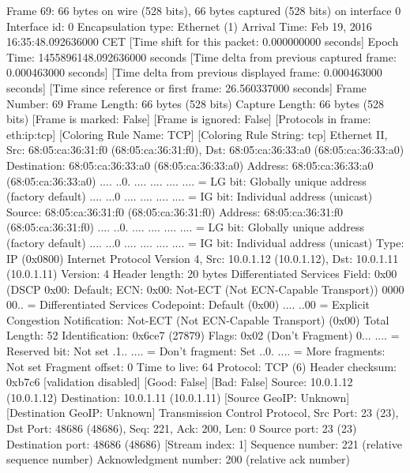Frame 69: 66 bytes on wire (528 bits), 66 bytes captured (528 bits) on interface 0
    Interface id: 0
    Encapsulation type: Ethernet (1)
    Arrival Time: Feb 19, 2016 16:35:48.092636000 CET
    [Time shift for this packet: 0.000000000 seconds]
    Epoch Time: 1455896148.092636000 seconds
    [Time delta from previous captured frame: 0.000463000 seconds]
    [Time delta from previous displayed frame: 0.000463000 seconds]
    [Time since reference or first frame: 26.560337000 seconds]
    Frame Number: 69
    Frame Length: 66 bytes (528 bits)
    Capture Length: 66 bytes (528 bits)
    [Frame is marked: False]
    [Frame is ignored: False]
    [Protocols in frame: eth:ip:tcp]
    [Coloring Rule Name: TCP]
    [Coloring Rule String: tcp]
Ethernet II, Src: 68:05:ca:36:31:f0 (68:05:ca:36:31:f0), Dst: 68:05:ca:36:33:a0 (68:05:ca:36:33:a0)
    Destination: 68:05:ca:36:33:a0 (68:05:ca:36:33:a0)
        Address: 68:05:ca:36:33:a0 (68:05:ca:36:33:a0)
        .... ..0. .... .... .... .... = LG bit: Globally unique address (factory default)
        .... ...0 .... .... .... .... = IG bit: Individual address (unicast)
    Source: 68:05:ca:36:31:f0 (68:05:ca:36:31:f0)
        Address: 68:05:ca:36:31:f0 (68:05:ca:36:31:f0)
        .... ..0. .... .... .... .... = LG bit: Globally unique address (factory default)
        .... ...0 .... .... .... .... = IG bit: Individual address (unicast)
    Type: IP (0x0800)
Internet Protocol Version 4, Src: 10.0.1.12 (10.0.1.12), Dst: 10.0.1.11 (10.0.1.11)
    Version: 4
    Header length: 20 bytes
    Differentiated Services Field: 0x00 (DSCP 0x00: Default; ECN: 0x00: Not-ECT (Not ECN-Capable Transport))
        0000 00.. = Differentiated Services Codepoint: Default (0x00)
        .... ..00 = Explicit Congestion Notification: Not-ECT (Not ECN-Capable Transport) (0x00)
    Total Length: 52
    Identification: 0x6ce7 (27879)
    Flags: 0x02 (Don't Fragment)
        0... .... = Reserved bit: Not set
        .1.. .... = Don't fragment: Set
        ..0. .... = More fragments: Not set
    Fragment offset: 0
    Time to live: 64
    Protocol: TCP (6)
    Header checksum: 0xb7c6 [validation disabled]
        [Good: False]
        [Bad: False]
    Source: 10.0.1.12 (10.0.1.12)
    Destination: 10.0.1.11 (10.0.1.11)
    [Source GeoIP: Unknown]
    [Destination GeoIP: Unknown]
Transmission Control Protocol, Src Port: 23 (23), Dst Port: 48686 (48686), Seq: 221, Ack: 200, Len: 0
    Source port: 23 (23)
    Destination port: 48686 (48686)
    [Stream index: 1]
    Sequence number: 221    (relative sequence number)
    Acknowledgment number: 200    (relative ack number)
